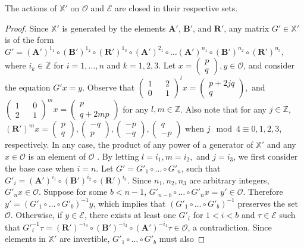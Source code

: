 \documentclass[]{article}
\begin{document}
\begin{lem}
The actions of $\mathbb{X}'$ on $\mathcal{O}$ and $\mathcal{E}$ are closed in their respective sets.
\begin{proof}
Since $\mathbb{X}'$ is generated by the elements $\mathbf{A}'$, $\mathbf{B}'$, and $\mathbf{R}'$, any matrix $G'\in\mathbb{X}'$ is of the form $G' = (\mathbf{A}')^{1_1}\circ(\mathbf{B}')^{1_2}\circ(\mathbf{R}')^{1_3}\circ(\mathbf{A}')^{2_1}\circ\dots(\mathbf{A}')^{n_1}\circ(\mathbf{B}')^{n_2}\circ(\mathbf{R}')^{n_3}$, where $i_k\in\mathbb{Z}$ for $i=1,\dots,n$ and $k=1,2,3.$ Let $x=\left(\begin{matrix}p \\ q  \end{matrix}\right),y\in\mathcal{O}$, and consider the equation $G'x=y$. Observe that $\left(\begin{matrix}1 && 2 \\ 0 && 1\end{matrix}\right)^l x=\left(\begin{matrix}p+2jq \\ q  \end{matrix}\right),$ and $ \left(\begin{matrix}1 && 0 \\ 2 && 1\end{matrix}\right)^m x=\left(\begin{matrix}p \\ q+2mp  \end{matrix}\right)$ for any $l,m\in\mathbb{Z}$. Also note that for any $j\in\mathbb{Z}$, $(\mathbf{R}')^{m}x=\left(\begin{matrix}p \\ q  \end{matrix}\right),\left(\begin{matrix}-q\\ p  \end{matrix}\right),\left(\begin{matrix}-p \\ -q  \end{matrix}\right),\left(\begin{matrix}q \\ -p  \end{matrix}\right)$ when $j \mod{4}\equiv0,1,2,3$, respectively. In any case, the product of any power of a generator of $\mathbb{X}'$ and any $x\in\mathcal{O}$ is an element of $\mathcal{O}$ . By letting $l=i_1,m=i_2,$ and $j=i_3$, we first consider the base case when $i=n$. Let $G'=G'_1\circ\dots\circ G'_n$, such that $G'_i=(\mathbf{A}')^{i_1}\circ(\mathbf{B}')^{i_2}\circ(\mathbf{R}')^{i_3}$. Since $n_1,n_2,n_3$ are arbitrary integers, $G'_n x \in\mathcal{O}$. Suppose for some $b< n-1$, $G'_{n-b}\circ\dots\circ G'_n x =y'\in\mathcal{O}$. Therefore $y'=(G'_1\circ\dots\circ G'_{b})^{-1}y$, which implies that $(G'_1\circ\dots\circ G'_{b})^{-1}$ preserves the set $\mathcal{O}$. Otherwise, if $y\in\mathcal{E}$, there exists at least one $G'_i$ for $1< i< b$ and $\tau\in\mathcal{E}$ such that $G'^{-1}_i \tau = (\mathbf{R}')^{-i_3}\circ(\mathbf{B}')^{-i_2}\circ(\mathbf{A}')^{-i_1} \tau \in \mathcal{O}$, a contradiction. Since elements in $\mathbb{X}'$ are invertible, $G'_1\circ\dots\circ G'_{b}$ must also 
\end{proof}
\end{lem}
\end{document}
